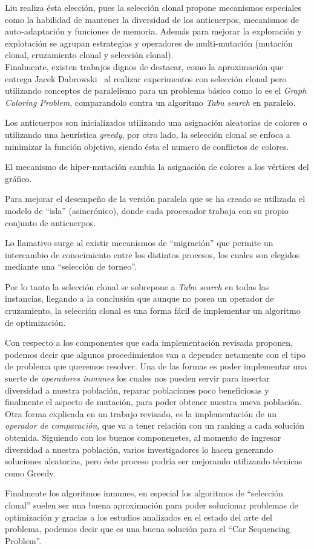 Liu realiza ésta elección, pues la selección clonal propone mecanismos especiales como la habilidad de mantener la diversidad
de los anticuerpos, mecanismos de auto-adaptación y funciones de memoria. Además para mejorar la exploración y explotación
se agrupan estrategias y operadores de multi-mutación (mutación clonal, cruzamiento clonal y selección clonal).\\


Finalmente, existen trabajos dignos de destacar, como la aproximación que entrega Jacek Dabrowski~\cite{graph}
al realizar experimentos con selección clonal pero utilizando conceptos de paralelismo para un problema básico como lo es
el \emph{Graph Coloring Problem}, comparandolo contra un algoritmo \emph{Tabu search} en paralelo.

Los anticuerpos son inicializados utilizando una asignación aleatorias de colores o utilizando una heurística \emph{greedy},
por otro lado, la selección clonal se enfoca a minimizar la función objetivo, siendo ésta el numero de conflictos de colores.

El mecanismo de hiper-mutación cambia la asignación de colores a los vértices del gráfico.

Para mejorar el desempeño de la versión paralela que se ha creado se utilizada el modelo de ``isla'' (asincrónico),
donde cada procesador trabaja con su propio conjunto de anticuerpos.

Lo llamativo surge al existir mecanismos de ``migración'' que permite un intercambio de conocimiento entre los 
distintos procesos, los cuales son elegidos mediante una ``selección de torneo''.

Por lo tanto la selección clonal se sobrepone a \emph{Tabu search} en todas las instancias,
llegando a la conclusión que aunque no posea un operador de cruzamiento, la selección clonal
es una forma fácil de implementar un algoritmo de optimización.

Con respecto a los componentes que cada implementación revisada proponen, podemos decir que algunos procedimientos
van a depender netamente con el tipo de problema que queremos resolver. Una de las formas es poder implementar
una suerte de \emph{operadores inmunes} los cuales nos pueden servir para insertar diversidad a nuestra población,
reparar poblaciones poco beneficiosas y finalmente el aspecto de mutación, para poder obtener nuestra nueva
población.
Otra forma explicada en un trabajo revisado, es la implementación de un \emph{operador de comparación}, que va
a tener relación con un ranking a cada solución obtenida.
Siguiendo con los buenos componenetes, al momento de ingresar diversidad a nuestra población, varios investigadores
lo hacen generando soluciones aleatorias, pero éste proceso podría ser mejorando utilizando técnicas como Greedy.


Finalmente los algoritmos inmunes, en especial los algoritmos de ``selección clonal'' suelen ser una buena aproximación
para poder solucionar problemas de optimización y gracias a los estudios analizados en el estado del arte del problema,
podemos decir que es una buena solución para el ``Car Sequencing Problem''.
